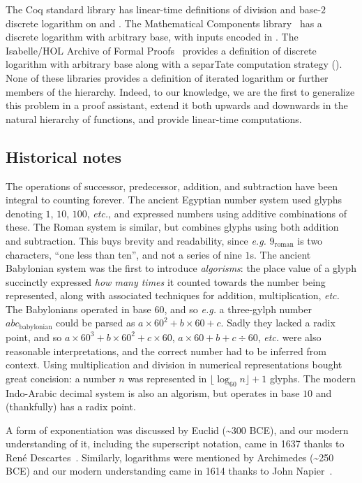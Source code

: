 
%

The Coq standard library has linear-time definitions
of division and base-$2$ discrete logarithm on  and .
The Mathematical Components library~\cite{MathComp}
has a discrete logarithm with arbitrary base, with inputs encoded in .
The Isabelle/HOL Archive of Formal Proofs~\cite{isastan2019} 
provides a definition of discrete logarithm
with arbitrary base along with a separTate computation strategy (\lstset{style=isaStyle}\li{[code]}\lstset{style=myStyle}).
None of these libraries provides a definition of iterated logarithm or
further members of the hierarchy.
Indeed, to our knowledge, we are the first to generalize this
problem in a proof assistant, extend it both
upwards and downwards in the natural hierarchy of functions, and
provide linear-time computations.

\subsection{Historical notes}
The operations of successor, predecessor, addition, and subtraction have
been integral to counting forever. The ancient Egyptian
number system used glyphs denoting $1$, $10$, $100$, \emph{etc.},
and expressed numbers using additive combinations of these.
The Roman system is similar, but
combines glyphs using both addition and subtraction.
This buys brevity and readability,
since \emph{e.g.} $9_{\text{roman}}$ is two characters, ``one less than ten'',
and not a series of nine $1$s.
The ancient Babylonian system was the first to introduce 
\emph{algorisms}: the place value of a glyph succinctly expressed \emph{how many times} 
it counted towards the number being represented, along with associated techniques for addition, multiplication, \emph{etc.}
The Babylonians operated in
base $60$, and so \emph{e.g.} a three-gylph number $abc_{\text{babylonian}}$ could
be parsed as $a \times 60^2 + b \times 60 + c$. Sadly they lacked
a radix point, and so
$a \times 60^3 + b \times 60^2 + c \times 60$, $a \times 60 + b + c \div 60$,
\emph{etc.} were also reasonable interpretations, and the correct number had
to be inferred from context.
Using multiplication and division in numerical representations bought great concision: a number $n$ was
represented in $\lfloor \log_{60}n \rfloor + 1$ glyphs.
The modern Indo-Arabic decimal system is also an algorism, 
but operates in base $10$ and (thankfully) has a radix point.

A form of exponentiation was discussed by Euclid (\textasciitilde 300 BCE), and our modern
understanding of it, including the superscript notation,
came in 1637 thanks to René Descartes~\cite{descartes}. 
Similarly, logarithms were mentioned by 
Archimedes (\textasciitilde 250 BCE) and our modern understanding came in 1614 thanks to 
John Napier~\cite{napier}.

